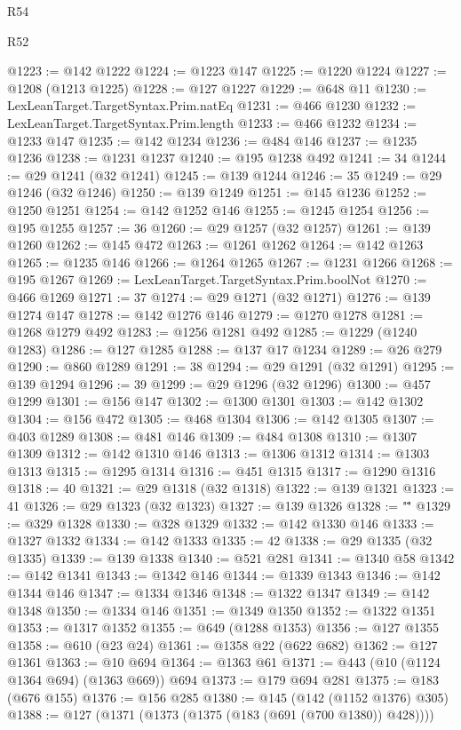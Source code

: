 \begin{lexlean}{R54}
\begin{lexlean}{R52}
\begin{coremodule}
{{{{{{{{{{{{{{{{{{{{{{{{{{{{{{{{{{{{{{{{{{{{{{{{{{{{{{{{{{{{{{{{{{{{{{{{{{{{{{{{{{{{{{{{{{{{{{{{{{{{{{{{{{{{{{{{{{{{{{{{{{{{{{{{{{{{{{{{{{{{{{{{{{{{{{{{{{{{{{{{{{{{{{{{{{{{{{{{{{{{{{{{{{{{{{{{{{{{{{@1223 := @142 @1222
@1224 := @1223 @147
@1225 := @1220 @1224
@1227 := @1208 (@1213 @1225)
@1228 := @127 @1227
@1229 := @648 @11
@1230 := LexLeanTarget.TargetSyntax.Prim.natEq
@1231 := @466 @1230
@1232 := LexLeanTarget.TargetSyntax.Prim.length
@1233 := @466 @1232
@1234 := @1233 @147
@1235 := @142 @1234
@1236 := @484 @146
@1237 := @1235 @1236
@1238 := @1231 @1237
@1240 := @195 @1238 @492
@1241 := 34
@1244 := @29 @1241 (@32 @1241)
@1245 := @139 @1244
@1246 := 35
@1249 := @29 @1246 (@32 @1246)
@1250 := @139 @1249
@1251 := @145 @1236
@1252 := @1250 @1251
@1254 := @142 @1252 @146
@1255 := @1245 @1254
@1256 := @195 @1255
@1257 := 36
@1260 := @29 @1257 (@32 @1257)
@1261 := @139 @1260
@1262 := @145 @472
@1263 := @1261 @1262
@1264 := @142 @1263
@1265 := @1235 @146
@1266 := @1264 @1265
@1267 := @1231 @1266
@1268 := @195 @1267
@1269 := LexLeanTarget.TargetSyntax.Prim.boolNot
@1270 := @466 @1269
@1271 := 37
@1274 := @29 @1271 (@32 @1271)
@1276 := @139 @1274 @147
@1278 := @142 @1276 @146
@1279 := @1270 @1278
@1281 := @1268 @1279 @492
@1283 := @1256 @1281 @492
@1285 := @1229 (@1240 @1283)
@1286 := @127 @1285
@1288 := @137 @17 @1234
@1289 := @26 @279
@1290 := @860 @1289
@1291 := 38
@1294 := @29 @1291 (@32 @1291)
@1295 := @139 @1294
@1296 := 39
@1299 := @29 @1296 (@32 @1296)
@1300 := @457 @1299
@1301 := @156 @147
@1302 := @1300 @1301
@1303 := @142 @1302
@1304 := @156 @472
@1305 := @468 @1304
@1306 := @142 @1305
@1307 := @403 @1289
@1308 := @481 @146
@1309 := @484 @1308
@1310 := @1307 @1309
@1312 := @142 @1310 @146
@1313 := @1306 @1312
@1314 := @1303 @1313
@1315 := @1295 @1314
@1316 := @451 @1315
@1317 := @1290 @1316
@1318 := 40
@1321 := @29 @1318 (@32 @1318)
@1322 := @139 @1321
@1323 := 41
@1326 := @29 @1323 (@32 @1323)
@1327 := @139 @1326
@1328 := "\""
@1329 := @329 @1328
@1330 := @328 @1329
@1332 := @142 @1330 @146
@1333 := @1327 @1332
@1334 := @142 @1333
@1335 := 42
@1338 := @29 @1335 (@32 @1335)
@1339 := @139 @1338
@1340 := @521 @281
@1341 := @1340 @58
@1342 := @142 @1341
@1343 := @1342 @146
@1344 := @1339 @1343
@1346 := @142 @1344 @146
@1347 := @1334 @1346
@1348 := @1322 @1347
@1349 := @142 @1348
@1350 := @1334 @146
@1351 := @1349 @1350
@1352 := @1322 @1351
@1353 := @1317 @1352
@1355 := @649 (@1288 @1353)
@1356 := @127 @1355
@1358 := @610 (@23 @24)
@1361 := @1358 @22 (@622 @682)
@1362 := @127 @1361
@1363 := @10 @694
@1364 := @1363 @61
@1371 := @443 (@10 (@1124 @1364 @694) (@1363 @669)) @694
@1373 := @179 @694 @281
@1375 := @183 (@676 @155)
@1376 := @156 @285
@1380 := @145 (@142 (@1152 @1376) @305)
@1388 := @127 (@1371 (@1373 (@1375 (@183 (@691 (@700 @1380)) @428))))
}}}}}}}}}}}}}}}}}}}}}}}}}}}}}}}}}}}}}}}}}}}}}}}}}}}}}}}}}}}}}}}}}}}}}}}}}}}}}}}}}}}}}}}}}}}}}}}}}}}}}}}}}}}}}}}}}}}}}}}}}}}}}}}}}}}}}}}}}}}}}}}}}}}}}}}}}}}}}}}}}}}}}}}}}}}}}}}}}}}}}}}}}}}}}}}}}}}}}}
\end{coremodule}
\end{lexlean}
\end{lexlean}
